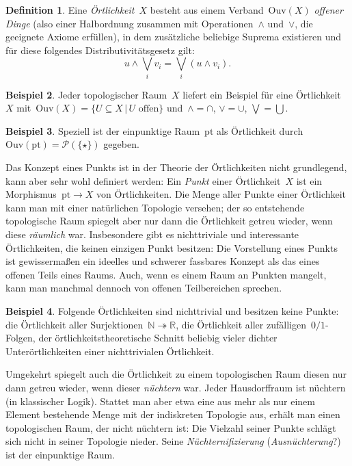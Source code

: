\documentclass[a4paper,ngerman,12pt]{scrartcl}
\theoremstyle{definition}
\newtheorem{defn}{Definition}[section]
\newtheorem{bsp}[defn]{Beispiel}
\theoremstyle{plain}
\theoremstyle{remark}
\newcommand{\RR}{\mathbb{R}}
\newcommand{\NN}{\mathbb{N}}
\renewcommand{\P}{\mathcal{P}}
\newcommand{\Ouv}{\mathrm{Ouv}}
\newcommand{\pt}{\mathrm{pt}}
\renewcommand{\_}{\mathpunct{.}\,}
\newcommand{\?}{\,{:}\,}
\begin{document}
\begin{defn}Eine \emph{Örtlichkeit}~$X$ besteht aus einem Verband~$\Ouv(X)$
\emph{offener Dinge} (also einer Halbordnung zusammen mit Operationen~$\wedge$
und~$\vee$, die geeignete Axiome erfüllen), in dem zusätzliche beliebige
Suprema existieren und für diese folgendes Distributivitätsgesetz gilt:
\[ u \wedge \bigvee_i v_i = \bigvee_i (u \wedge v_i). \]
\end{defn}

\begin{bsp}
Jeder topologischer Raum~$X$ liefert ein Beispiel für eine Örtlichkeit~$X$
mit~$\Ouv(X) = \{ U \subseteq X \,|\, \text{$U$ offen} \}$ und~$\wedge =
\cap$, $\vee = \cup$, $\bigvee = \bigcup$.\end{bsp}

\begin{bsp}Speziell ist der einpunktige Raum~$\pt$ als Örtlichkeit
durch~$\Ouv(\pt) = \P(\{\star\})$ gegeben.\end{bsp}

Das Konzept eines Punkts ist in der Theorie der Örtlichkeiten nicht
grundlegend, kann aber sehr wohl definiert werden: Ein \emph{Punkt} einer
Örtlichkeit~$X$ ist ein Morphismus~$\pt \to X$ von Örtlichkeiten. Die Menge
aller Punkte einer Örtlichkeit kann man mit einer natürlichen Topologie
versehen; der so entstehende topologische Raum spiegelt aber nur dann die
Örtlichkeit getreu wieder, wenn diese \emph{räumlich} war. Insbesondere gibt es
nichttriviale und interessante Örtlichkeiten, die keinen einzigen Punkt
besitzen: Die Vorstellung eines Punkts ist gewissermaßen ein ideelles und
schwerer fassbares Konzept als das eines offenen Teils eines Raums. Auch, wenn
es einem Raum an Punkten mangelt, kann man manchmal dennoch von offenen
Teilbereichen sprechen.

\begin{bsp}Folgende Örtlichkeiten sind nichttrivial und besitzen keine Punkte:
die Örtlichkeit aller Surjektionen~$\NN \twoheadrightarrow \RR$, die
Örtlichkeit aller zufälligen~$0/1$-Folgen, der örtlichkeitstheoretische Schnitt
beliebig vieler dichter Unterörtlichkeiten einer nichttrivialen Örtlichkeit.\end{bsp}

Umgekehrt spiegelt auch die Örtlichkeit zu einem topologischen Raum diesen nur
dann getreu wieder, wenn dieser \emph{nüchtern} war. Jeder Hausdorffraum ist
nüchtern (in klassischer Logik).
Stattet man aber etwa eine aus mehr als nur einem Element bestehende Menge 
mit der indiskreten Topologie aus, erhält man einen
topologischen Raum, der nicht nüchtern ist: Die Vielzahl seiner Punkte schlägt
sich nicht in seiner Topologie nieder. Seine \emph{Nüchternifizierung}
(\emph{Ausnüchterung}?) ist der einpunktige Raum.
\end{document}
